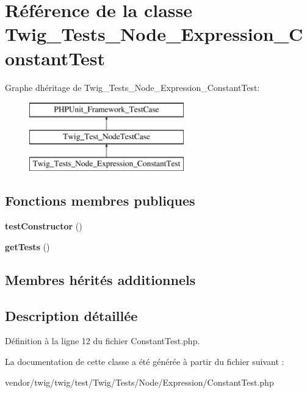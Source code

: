 \hypertarget{class_twig___tests___node___expression___constant_test}{}\section{Référence de la classe Twig\+\_\+\+Tests\+\_\+\+Node\+\_\+\+Expression\+\_\+\+Constant\+Test}
\label{class_twig___tests___node___expression___constant_test}
Graphe d\textquotesingle{}héritage de Twig\+\_\+\+Tests\+\_\+\+Node\+\_\+\+Expression\+\_\+\+Constant\+Test\+:\begin{figure}[H]
\begin{center}
\leavevmode
\includegraphics[height=3.000000cm]{class_twig___tests___node___expression___constant_test}
\end{center}
\end{figure}
\subsection*{Fonctions membres publiques}
\begin{DoxyCompactItemize}
\item 
{\bfseries test\+Constructor} ()\hypertarget{class_twig___tests___node___expression___constant_test_a47094dc941e72950570900d1418f89c6}{}\label{class_twig___tests___node___expression___constant_test_a47094dc941e72950570900d1418f89c6}

\item 
{\bfseries get\+Tests} ()\hypertarget{class_twig___tests___node___expression___constant_test_a7e247dd31cc8d37a6c97353a062a0080}{}\label{class_twig___tests___node___expression___constant_test_a7e247dd31cc8d37a6c97353a062a0080}

\end{DoxyCompactItemize}
\subsection*{Membres hérités additionnels}


\subsection{Description détaillée}


Définition à la ligne 12 du fichier Constant\+Test.\+php.



La documentation de cette classe a été générée à partir du fichier suivant \+:\begin{DoxyCompactItemize}
\item 
vendor/twig/twig/test/\+Twig/\+Tests/\+Node/\+Expression/Constant\+Test.\+php\end{DoxyCompactItemize}
